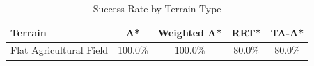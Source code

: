 \begin{table}[htbp]
\centering
\caption{Success Rate by Terrain Type}
\begin{tabular}{l|cccc}
\hline
Terrain & A* & Weighted A* & RRT* & TA-A* \\
\hline
Flat Agricultural Field & 100.0\% & 100.0\% & 80.0\% & 80.0\% \\
\hline
\end{tabular}
\end{table}
